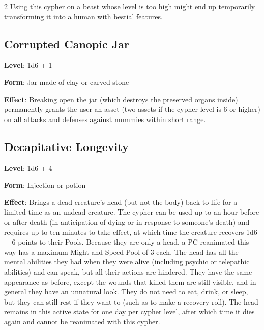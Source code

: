 \begin{multicols}{2}
Using this cypher on a beast whose level is too high might end up temporarily transforming it into a human with bestial features.

\subsection{Corrupted Canopic Jar}

\textbf{Level}: 1d6 + 1

\textbf{Form}: Jar made of clay or carved stone 

\textbf{Effect}: Breaking open the jar (which destroys the preserved organs inside) permanently grants the user an asset (two assets if the cypher level is 6 or higher) on all attacks and defenses against mummies within short range.

\subsection{Decapitative Longevity}

\textbf{Level}: 1d6 + 4

\textbf{Form}: Injection or potion

\textbf{Effect}: Brings a dead creature’s head (but not the body) back to life for a limited time as an undead creature. The cypher can be used up to an hour before or after death (in anticipation of dying or in response to someone’s death) and requires up to ten minutes to take effect, at which time the creature recovers 1d6 + 6 points to their Pools. Because they are only a head, a PC reanimated this way has a maximum Might and Speed Pool of 3 each. The head has all the mental abilities they had when they were alive (including psychic or telepathic abilities) and can speak, but all their actions are hindered. They have the same appearance as before, except the wounds that killed them are still visible, and in general they have an unnatural look. They do not need to eat, drink, or sleep, but they can still rest if they want to (such as to make a recovery roll). The head remains in this active state for one day per cypher level, after which time it dies again and cannot be reanimated with this cypher.


\end{multicols}
